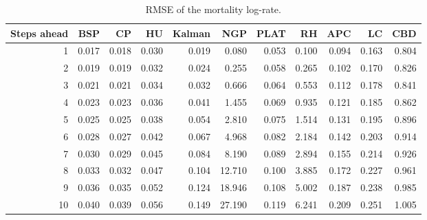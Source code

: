 % 
\begin{table}[ht]
\centering
\begin{tabular}{rrrrrrrrrrr}
  \hline
Steps ahead & BSP & CP & HU & Kalman & NGP & PLAT & RH & APC & LC & CBD \\ 
  \hline
   1 & 0.017 & 0.018 & 0.030 & 0.019 & 0.080 & 0.053 & 0.100 & 0.094 & 0.163 & 0.804 \\ 
     2 & 0.019 & 0.019 & 0.032 & 0.024 & 0.255 & 0.058 & 0.265 & 0.102 & 0.170 & 0.826 \\ 
     3 & 0.021 & 0.021 & 0.034 & 0.032 & 0.666 & 0.064 & 0.553 & 0.112 & 0.178 & 0.841 \\ 
     4 & 0.023 & 0.023 & 0.036 & 0.041 & 1.455 & 0.069 & 0.935 & 0.121 & 0.185 & 0.862 \\ 
     5 & 0.025 & 0.025 & 0.038 & 0.054 & 2.810 & 0.075 & 1.514 & 0.131 & 0.195 & 0.896 \\ 
     6 & 0.028 & 0.027 & 0.042 & 0.067 & 4.968 & 0.082 & 2.184 & 0.142 & 0.203 & 0.914 \\ 
     7 & 0.030 & 0.029 & 0.045 & 0.084 & 8.190 & 0.089 & 2.894 & 0.155 & 0.214 & 0.926 \\ 
     8 & 0.033 & 0.032 & 0.047 & 0.104 & 12.710 & 0.100 & 3.885 & 0.172 & 0.227 & 0.961 \\ 
     9 & 0.036 & 0.035 & 0.052 & 0.124 & 18.946 & 0.108 & 5.002 & 0.187 & 0.238 & 0.985 \\ 
    10 & 0.040 & 0.039 & 0.056 & 0.149 & 27.190 & 0.119 & 6.241 & 0.209 & 0.251 & 1.005 \\ 
   \hline
\end{tabular}
\caption{RMSE of the mortality log-rate.} 
\end{table}
